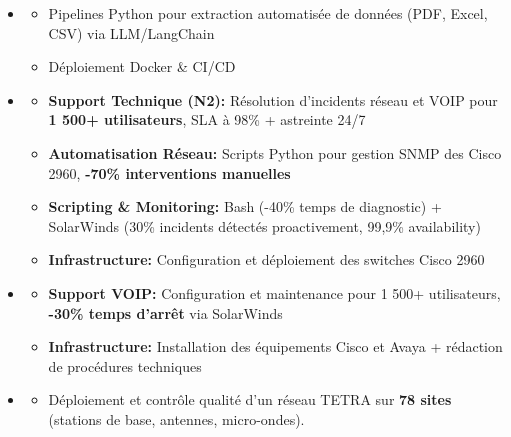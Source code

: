 \documentclass[11pt,a4paper]{article}
\renewcommand{\itemspace}{\vspace{0.15em}}
\begin{document}
\begin{itemize}[leftmargin=1em, label={}]
    \item
    \begin{itemize}[leftmargin=1.5em, label=$\circ$, nosep]
        \item Pipelines Python pour extraction automatisée de données (PDF, Excel, CSV) via LLM/LangChain
        \item Déploiement Docker \& CI/CD
    \end{itemize}

    \itemspace 
    \item
    \begin{itemize}[leftmargin=1.5em, label=$\circ$, nosep]
        \item \textbf{Support Technique (N2):} Résolution d'incidents réseau et VOIP pour \textbf{1 500+ utilisateurs}, SLA à 98\% + astreinte 24/7
        \item \textbf{Automatisation Réseau:} Scripts Python pour gestion SNMP des Cisco 2960, \textbf{-70\% interventions manuelles}
        \item \textbf{Scripting \& Monitoring:} Bash (-40\% temps de diagnostic) + SolarWinds (30\% incidents détectés proactivement, 99,9\% availability)
        \item \textbf{Infrastructure:} Configuration et déploiement des switches Cisco 2960
    \end{itemize}

    \itemspace 
    \item
    \begin{itemize}[leftmargin=1.5em, label=$\circ$, nosep]
        \item \textbf{Support VOIP:} Configuration et maintenance pour 1 500+ utilisateurs, \textbf{-30\% temps d'arrêt} via SolarWinds
        \item \textbf{Infrastructure:} Installation des équipements Cisco et Avaya + rédaction de procédures techniques
    \end{itemize}

    \itemspace 
    \item
    \begin{itemize}[leftmargin=1.5em, label=$\circ$, nosep]
        \item Déploiement et contrôle qualité d'un réseau TETRA sur \textbf{78 sites} (stations de base, antennes, micro-ondes).
    \end{itemize}
\end{itemize}
\end{document}
